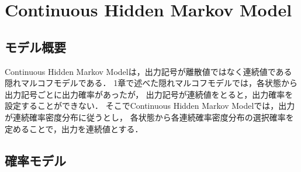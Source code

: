 \newpage
\section{Continuous Hidden Markov Model}
\subsection{モデル概要}
Continuous Hidden Markov Modelは，出力記号が離散値ではなく連続値である隠れマルコフモデルである．
1章で述べた隠れマルコフモデルでは，各状態から出力記号ごとに出力確率があったが，
出力記号が連続値をとると，出力確率を設定することができない．
そこでContinuous Hidden Markov Modelでは，出力が連続確率密度分布に従うとし，
各状態から各連続確率密度分布の選択確率を定めることで，出力を連続値とする．

\subsection{確率モデル}

